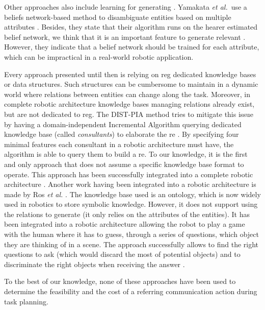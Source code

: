 \documentclass[a4paper,11pt,twoside]{StyleThese}
\begin{document}
Other approaches also include learning for generating . Yamakata \textit{et al.}~use a beliefs network-based method to disambiguate entities based on multiple attributes \cite{yamakata2004belief}. Besides, they state that their algorithm runs on the hearer estimated belief network, we think that it is an important feature to generate relevant . However, they indicate that a belief network should be trained for each attribute, which can be impractical in a real-world robotic application.

Every approach presented until then is relying on \acrshort{reg} dedicated knowledge bases or data structures. Such structures can be cumbersome to maintain in a dynamic world where relations between entities can change along the task. Moreover, in complete robotic architecture knowledge bases managing relations already exist, but are not dedicated to \acrshort{reg}. The DIST-PIA method tries to mitigate this issue by having a domain-independent Incremental Algorithm querying dedicated knowledge base (called \textit{consultants}) to elaborate the \acrshort{re} \cite{williams2017referring}. By specifying four minimal features each consultant in a robotic architecture must have, the algorithm is able to query them to build a \acrshort{re}. To our knowledge, it is the first and only approach that does not assume a specific knowledge base format to operate. This approach has been successfully integrated into a complete robotic architecture \cite{williams2019dempster}. Another work having been integrated into a robotic architecture is made by Ros \textit{et al.} \cite{ros2010one}. The knowledge base used is an ontology, which is now widely used in robotics to store symbolic knowledge. However, it does not support using the relations to generate  (it only relies on the attributes of the entities). It has been integrated into a robotic architecture allowing the robot to play a game with the human where it has to guess, through a series of questions, which object they are thinking of in a scene. The approach successfully allows to find the right questions to ask (which would discard the most of potential objects) and to discriminate the right objects when receiving the answer \cite{lemaignan2012grounding}.

To the best of our knowledge, none of these approaches have been used to determine the feasibility and the cost of a referring communication action during task planning.
\end{document}
